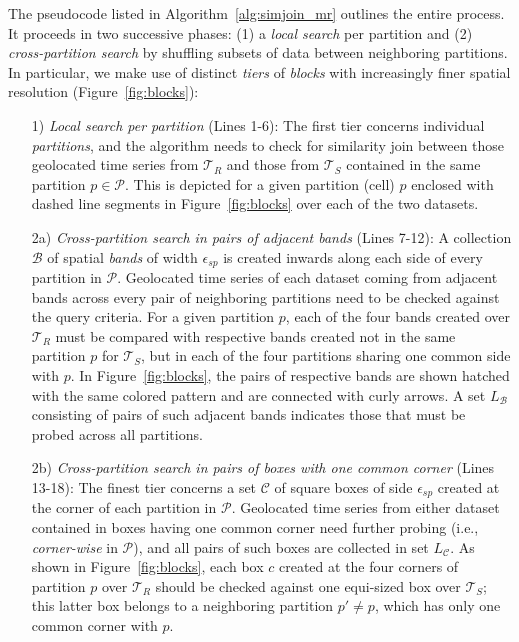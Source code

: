 The pseudocode listed in Algorithm~\ref{alg:simjoin_mr} outlines the entire process. It proceeds in two successive phases: (1) a {\em local search} per partition and (2) {\em cross-partition search} by shuffling subsets of data between neighboring partitions. In particular, we make use of distinct {\em tiers} of {\em blocks} with increasingly finer spatial resolution (Figure~\ref{fig:blocks}): 

\begin{enumerate}
\item[1)] {\em Local search per partition} (Lines 1-6): The first tier concerns individual {\em partitions}, and the algorithm needs to check for similarity join between those geolocated time series from $\mathcal{T}_{R}$ and those from $\mathcal{T}_{S}$ contained in the same partition $p \in \mathcal{P}$. This is depicted for a given partition (cell) $p$ enclosed with dashed line segments in Figure~\ref{fig:blocks} over each of the two datasets. 
\item[2a)] {\em Cross-partition search in pairs of adjacent bands} (Lines 7-12): A collection $\mathcal{B}$ of spatial {\em bands} of width $\epsilon_{sp}$ is created inwards along each side of every partition in $\mathcal{P}$. Geolocated time series of each dataset coming from adjacent bands across every pair of neighboring partitions need to be checked against the query criteria. For a given partition $p$, each of the four bands created over $\mathcal{T}_{R}$ must be compared with respective bands created not in the same partition $p$ for $\mathcal{T}_{S}$, but in each of the four partitions sharing one common side with $p$. In Figure~\ref{fig:blocks}, the pairs of respective bands are shown hatched with the same colored pattern and are connected with curly arrows. A set $L_{\mathcal{B}}$ consisting of pairs of such adjacent bands indicates those that must be probed across all partitions.
\item[2b)] {\em Cross-partition search in pairs of boxes with one common corner} (Lines 13-18): The finest tier concerns a set $\mathcal{C}$ of square boxes of side $\epsilon_{sp}$ created at the corner of each partition in $\mathcal{P}$. Geolocated time series from either dataset contained in boxes having one common corner need further probing (i.e., {\em corner-wise} in $\mathcal{P}$), and all pairs of such boxes are collected in set $L_{\mathcal{C}}$. As shown in Figure~\ref{fig:blocks}, each box $c$ created at the four corners of partition $p$ over $\mathcal{T}_{R}$ should be checked against one equi-sized box over $\mathcal{T}_{S}$; this latter box belongs to a neighboring partition $p' \neq p$, which has only one common corner with $p$. 
\end{enumerate}

